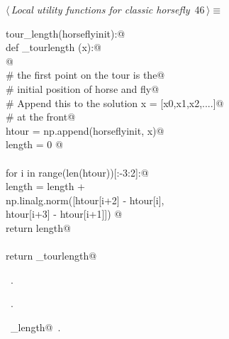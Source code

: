 \documentclass[11.5pt]{report}
\begin{document}
\begin{flushleft} \small\label{scrap67}\raggedright\small
{} $\langle\,${\itshape Local utility functions for classic horsefly}\nobreak\ {\footnotesize {46}}$\,\rangle\equiv$
\vspace{-1ex}
\begin{list}{}{} \item
\mbox{}\verb@def tour_length(horseflyinit):@\\
\mbox{}\verb@   def _tourlength (x):@\\
\mbox{}\verb@         @\\
\mbox{}\verb@        # the first point on the tour is the@\\
\mbox{}\verb@        # initial position of horse and fly@\\
\mbox{}\verb@        # Append this to the solution x = [x0,x1,x2,....]@\\
\mbox{}\verb@        # at the front@\\
\mbox{}\verb@        htour = np.append(horseflyinit, x)@\\
\mbox{}\verb@        length = 0 @\\
\mbox{}\verb@@\\
\mbox{}\verb@        for i in range(len(htour))[:-3:2]:@\\
\mbox{}\verb@                length = length + \@\\
\mbox{}\verb@                         np.linalg.norm([htour[i+2] - htour[i], \@\\
\mbox{}\verb@                                         htour[i+3] - htour[i+1]]) @\\
\mbox{}\verb@        return length@\\
\mbox{}\verb@@\\
\mbox{}\verb@   return _tourlength@\\
\mbox{}\verb@@{\NWsep}
\end{list}
\vspace{-1.5ex}
\footnotesize
\begin{list}{}{\setlength{\itemsep}{-\parsep}\setlength{\itemindent}{-\leftmargin}}
\item \NWtxtMacroDefBy\ .
\item \NWtxtMacroRefIn\ .
\item \NWtxtIdentsDefed\nobreak\  \verb@tour_length@\nobreak\ .
\item{}
\end{list}
\vspace{4ex}
\end{flushleft}
\end{document}
